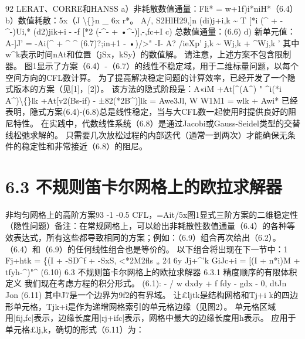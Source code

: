 \documentclass[UTF8,11pt,a4paper,openany,fontset=fandol]{ctexbook}
\begin{document}
92 LERAT、CORRE和HANSS a）非耗散数值通量：Fli* = w+1f)i*niH*（6.4）b）数值耗散：5x（J \textbackslash\{\}n \_ 6x r*。 A/, S2HlH29,]n (di)j+i,k \textasciitilde{} T [*i (\textasciicircum{} + -\textasciicircum{}-)Ui,* (d2)jik+i - -f [*2 (-\textasciicircum{}- + •\textasciicircum{}-)],-,fc+I c) 总数值通量：(6.6) d) 新单元值：A-]J' = -Ai(\textasciicircum{} + \textasciicircum{} \textasciicircum{} (6.7)?;in+1 - •)/>" -I- A? /ieXp' j,k \textasciitilde{} Wj,k + \textasciicircum{}Wj,k ' 其中w\textasciicircum{}k表示时间nAt和位置（jSx，kSy）的数值解。 请注意，上述方案不包含限制器。 图1显示了方案（6.4）-（6.7）的线性不稳定域，用于二维标量问题，以每个空间方向的CFL数计算。 为了提高解决稳定问题的计算效率，已经开发了一个隐式版本的方案（见[1]，[2]）。 该方法的隐式阶段是：A«iM +At[\textasciicircum{}(A\textasciicircum{}) " \textasciicircum{}i(*i A\textasciicircum{})\textbackslash\{\}lk +At[v2(Bs-if) - ±82(*2B\textasciicircum{})]lk = Awe3Jl, W W1M1 = wlk + Awi* 已经表明，隐式方案(6.4)-(6.8)总是线性稳定，当与大CFL数一起使用时提供良好的阻尼特性。 在实践中，代数线性系统（6.8）是通过Jacobi或Gauss-Seidel类型的交替线松弛求解的。 只需要几次放松过程的内部迭代（通常一到两次）才能确保无条件的稳定性和非常接近（6.8）的阻尼。

\section{6.3 不规则笛卡尔网格上的欧拉求解器}
非均匀网格上的高阶方案93 -1 -0.5 CFL，=Ait/5x图1显式三阶方案的二维稳定性（隐性问题）备注：在常规网格上，可以给出非耗散性数值通量（6.4）的各种等效表达式，所有这些都导致相同的方案；例如：（6.9）组合再次给出（6.2）。 （6.4）和（6.9）的任何线性组合也是等价的。 以下组合将出现在下一节中：1 Fj+htk = \{(I + -SD\textasciicircum{}f + -SxS, <*2M2fls „ 24 6y Jj+\textasciicircum{}'k GiJc+i = [(I + n*i)M + tfyh-\textasciicircum{})"\textasciicircum{} (6.10) 6.3 不规则笛卡尔网格上的欧拉求解器 6.3.1 精度顺序的有限体积定义 我们现在考虑方程的积分形式。 (6.1): - / w dxdy + f fdy - gdx - 0, dtJn Jon (6.11) 其中J7是一个边界为9f2的有界域。 让£ljtk是结构网格和Tj+i k的四边形单元格，Tjk+i是作为递增网格索引的单元格边缘（见图2）。 单元格区域用|fij,fc|表示，边缘长度用|rj+ifc|表示，网格中最大的边缘长度用h表示。 应用于单元格£lj,k，确切的形式（6.11）为：
\end{document}
